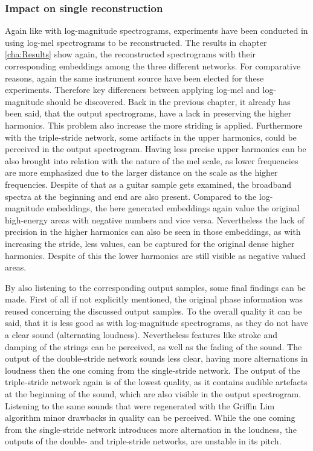 \subsubsection{Impact on single reconstruction}
Again like with log-magnitude spectrograms, experiments have been conducted in using log-mel spectrograms to be reconstructed. The results in chapter \ref{cha:Results} show again, the reconstructed spectrograms with their corresponding embeddings among the three different networks. For comparative reasons, again the same instrument source have been elected for these experiments. Therefore key differences between applying log-mel and log-magnitude should be discovered. Back in the previous chapter, it already has been said, that the output spectrograms, have a lack in preserving the higher harmonics. This problem also increase the more striding is applied. Furthermore with the triple-stride network, some artifacts in the upper harmonics, could be perceived in the output spectrogram. Having less precise upper harmonics can be also brought into relation with the nature of the mel scale, as lower frequencies are more emphasized due to the larger distance on the scale as the higher frequencies. Despite of that as a guitar sample gets examined, the broadband spectra at the beginning and end are also present. Compared to the log-magnitude embeddings, the here generated embeddings again value the original high-energy areas with negative numbers and vice versa. Nevertheless the lack of precision in the higher harmonics can also be seen in those embeddings, as with increasing the stride, less values, can be captured for the original dense higher harmonics. Despite of this the lower harmonics are still visible as negative valued areas. 

By also listening to the corresponding output samples, some final findings can be made. First of all if not explicitly mentioned, the original phase information was reused concerning the discussed output samples. To the overall quality it can be said, that it is less good as with log-magnitude spectrograms, as they do not have a clear sound (alternating loudness). Nevertheless features like stroke and damping of the strings can be perceived, as well as the fading of the sound. The output of the double-stride network sounds less clear, having more alternations in loudness then the one coming from the single-stride network. The output of the triple-stride network again is of the lowest quality, as it contains audible artefacts at the beginning of the sound, which are also visible in the output spectrogram. Listening to the same sounds that were regenerated with the Griffin Lim algorithm minor drawbacks in quality can be perceived. While the one coming from the single-stride network introduces more alternation in the loudness, the outputs of the double- and triple-stride networks, are unstable in its pitch. 

